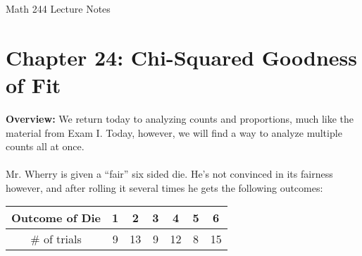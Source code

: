 \documentclass[12pt]{amsart}
\date{}
\theoremstyle{definition}
\begin{document}
\newcommand{\ph}{\phantom}
\newcommand{\ds}{\displaystyle}

\renewcommand{\emph}{\textbf}
\onehalfspace


\fancyhf{}   %
\renewcommand{\headrulewidth}{0.4pt} %
\fancyfootoffset[LE,LO]{0in}        %
\renewcommand{\footrulewidth}{0.4pt} %




\begin{center}

	\larger[3]	Math 244 Lecture Notes \smaller[3]		\\[22pt]

\end{center}

\section*{Chapter 24: Chi-Squared Goodness of Fit}




 \textbf{Overview:} We return today to analyzing counts and proportions, much like the material from Exam I. Today, however, we will find a way to analyze multiple counts all at once.\\
 ~\\
 \noindent Mr. Wherry is given a ``fair'' six sided die. He's not convinced in its fairness however, and after rolling it several times he gets the following outcomes:
 
\begin{center}
\begin{tabular}{c|c|c|c|c|c|c}
Outcome of Die & 1 & 2 & 3 & 4 & 5 & 6\\\hline
$\#$ of trials & 9 & 13 & 9 & 12 & 8 & 15
\end{tabular}
\end{center}
\vspace{1in}
\end{document}
